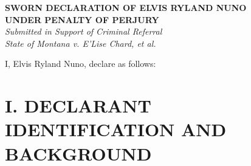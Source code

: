 \documentclass[12pt,letterpaper]{article}
\begin{document}
\begin{center}
\textbf{\large SWORN DECLARATION OF ELVIS RYLAND NUNO}\\
\textbf{\large UNDER PENALTY OF PERJURY}\\
\vspace{0.3cm}
\textit{Submitted in Support of Criminal Referral}\\
\textit{State of Montana v. E'Lise Chard, et al.}
\end{center}

\vspace{0.5cm}

I, Elvis Ryland Nuno, declare as follows:

\section*{I. DECLARANT IDENTIFICATION AND BACKGROUND}
\end{document}
